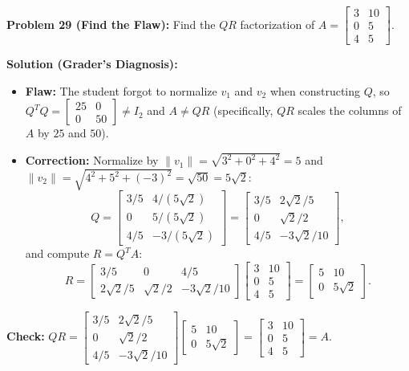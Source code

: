 \documentclass[11pt, letterpaper]{article}
\theoremstyle{definition}
\theoremstyle{remark}
\begin{document}
\vspace{0.8em}

\textbf{Problem 29 (Find the Flaw):} Find the $QR$ factorization of $A = \begin{bmatrix} 3 & 10 \\ 0 & 5 \\ 4 & 5 \end{bmatrix}$.

\textbf{Solution (Grader's Diagnosis):}
\begin{itemize}
    \item \textbf{Flaw:} The student forgot to normalize $v_1$ and $v_2$ when constructing $Q$, so $Q^T Q = \begin{bmatrix} 25 & 0 \\ 0 & 50 \end{bmatrix} \neq I_2$ and $A \neq QR$ (specifically, $Q R$ scales the columns of $A$ by $25$ and $50$).
    \item \textbf{Correction:} Normalize by $\|v_1\| = \sqrt{3^2 + 0^2 + 4^2} = 5$ and $\|v_2\| = \sqrt{4^2 + 5^2 + (-3)^2} = \sqrt{50} = 5\sqrt{2}$:
    \[
        Q = \begin{bmatrix}
            3/5 & 4/(5\sqrt{2}) \\
            0 & 5/(5\sqrt{2}) \\
            4/5 & -3/(5\sqrt{2})
        \end{bmatrix}
        = \begin{bmatrix}
            3/5 & 2\sqrt{2}/5 \\
            0 & \sqrt{2}/2 \\
            4/5 & -3\sqrt{2}/10
        \end{bmatrix},
    \]
    and compute $R = Q^T A$:
    \[
        R = \begin{bmatrix}
            3/5 & 0 & 4/5 \\
            2\sqrt{2}/5 & \sqrt{2}/2 & -3\sqrt{2}/10
        \end{bmatrix}
        \begin{bmatrix}
            3 & 10 \\
            0 & 5 \\
            4 & 5
        \end{bmatrix}
        = \begin{bmatrix}
            5 & 10 \\
            0 & 5\sqrt{2}
        \end{bmatrix}.
    \]
\end{itemize}
\textbf{Check:} $QR = \begin{bmatrix} 3/5 & 2\sqrt{2}/5 \\ 0 & \sqrt{2}/2 \\ 4/5 & -3\sqrt{2}/10 \end{bmatrix} \begin{bmatrix} 5 & 10 \\ 0 & 5\sqrt{2} \end{bmatrix} = \begin{bmatrix} 3 & 10 \\ 0 & 5 \\ 4 & 5 \end{bmatrix} = A$.
\end{document}
